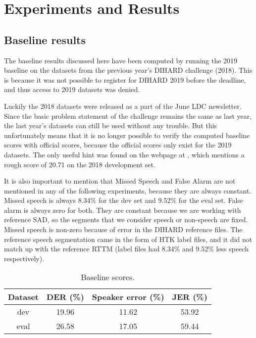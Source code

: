 \chapter{Experiments and Results}

	\section{Baseline results}
	The baseline results discussed here have been computed by running the 2019 baseline on the datasets from the previous year's DIHARD challenge (2018). This is because it was not possible to register for DIHARD 2019 before the deadline, and thus access to 2019 datasets was denied.
	
	Luckily the 2018 datasets were released as a part of the June LDC newsletter. Since the basic problem statement of the challenge remains the same as last year, the last year's datasets can still be used without any trouble. But this unfortunately means that it is no longer possible to verify the computed baseline scores with official scores, because the official scores only exist for the 2019 datasets. The only useful hint was found on the webpage at \cite{dihard2-unofficial}, which mentions a rough score of 20.71 on the 2018 development set.
	
	It is also important to mention that Missed Speech and False Alarm are not mentioned in any of the following experiments, because they are always constant. Missed speech is always 8.34\% for the dev set and 9.52\% for the eval set. False alarm is always zero for both. They are constant because we are working with reference SAD, so the segments that we consider speech or non-speech are fixed. Missed speech is non-zero because of error in the DIHARD reference files. The reference speech segmentation came in the form of HTK label files, and it did not match up with the reference RTTM (label files had 8.34\% and 9.52\% less speech respectively).
	
	\begin{table}[h]
		\centering
		\begin{tabular}{|c|c|c|c|}
			\hline
			Dataset & DER (\%) & Speaker error (\%) & JER (\%) \\
			\hline
			dev & 19.96 & 11.62 & 53.92 \\
			\hline
			eval & 26.58 & 17.05 & 59.44 \\
			\hline
		\end{tabular}
	\caption{Baseline scores.}
	\end{table}
	
